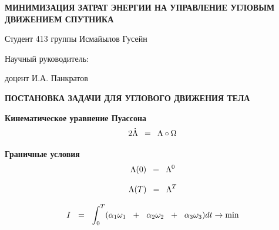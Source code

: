 \documentclass[14pt]{extreport}
\begin{document}
\begin{landscape}
\vspace*{90px}

\begin{center}
 \Huge{\textbf{МИНИМИЗАЦИЯ ЗАТРАТ ЭНЕРГИИ НА УПРАВЛЕНИЕ УГЛОВЫМ ДВИЖЕНИЕМ СПУТНИКА}}
\end{center}

\vspace*{120px}

\large{Студент 413 группы Исмайылов Гусейн}

\large{Научный руководитель:}

\large{доцент И.А. Панкратов}
\end{landscape}
\newpage
\begin{landscape}
\begin{center}
 \huge{\textbf{ПОСТАНОВКА ЗАДАЧИ ДЛЯ УГЛОВОГО ДВИЖЕНИЯ ТЕЛА}}
\end{center}

\vspace*{40px}

\large{\textbf{Кинематическое уравнение Пуассона}}
\begin{equation}
\LARGE{2\dot{\Lambda}\ =\ \Lambda \circ \Omega}
\end{equation}

\large{\textbf{Граничные условия}}
\begin{equation}
\LARGE{\Lambda(0)\ =\ \Lambda^0}
\end{equation}

\begin{equation}
\LARGE{\Lambda(T)\ =\ \Lambda^T}
\end{equation}

\begin{equation}
\huge{I\ =\ \int_{0}^{T}(\alpha_1\omega_1\ +\ \alpha_2\omega_2\ +\ \alpha_3\omega_3)dt \rightarrow \min}
\end{equation}
\end{landscape}
\newpage
\end{document}
